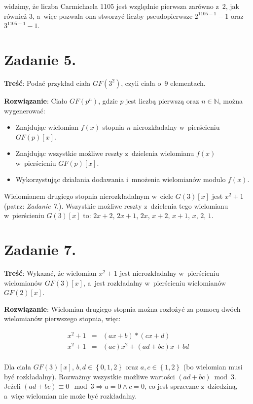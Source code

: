 \documentclass[a4paper,10pt, twocolumn]{article}
\begin{document}
\noindent widzimy, że liczba Carmichaela 1105 jest względnie pierwsza zarówno z~2, jak również 3, a~więc pozwala ona stworzyć liczby pseudopierwsze $2^{1105 - 1} - 1$ oraz $3^{1105 - 1} - 1$.

\section{Zadanie 5.}

\textbf{Treść}: Podać przykład ciała $GF(3^{2})$, czyli ciała o~9 elementach.

\textbf{Rozwiązanie}: Ciało $GF(p^{n})$, gdzie $p$ jest liczbą pierwszą oraz $n \in \mathbb{N}$, można wygenerować:

\begin{itemize}
 \item Znajdując wielomian $f(x)$ stopnia $n$ nierozkładalny w~pierścieniu $GF(p)[x]$.
 \item Znajdując wszystkie możliwe reszty z~dzielenia wielomianu $f(x)$ w~pierścieniu $GF(p)[x]$.
 \item Wykorzystując działania dodawania i~mnożenia wielomianów modulo $f(x)$.
\end{itemize}

Wielomianem drugiego stopnia nierozkładalnym w~ciele $G(3)[x]$ jest $x^2 + 1$ (patrz: \emph{Zadanie 7.}). Wszystkie możliwe reszty z~dzielenia tego wielomianu w~pierścieniu $G(3)[x]$ to: $2x + 2$, $2x + 1$, $2x$, $x + 2$, $x + 1$, $x$, $2$, $1$.

\section{Zadanie 7.}

\textbf{Treść}: Wykazać, że wielomian $x^{2} + 1$ jest nierozkładalny w~pierścieniu wielomianów $GF(3)[x]$, a~jest rozkładalny w~pierścieniu wielomianów $GF(2)[x]$.

\textbf{Rozwiązanie}: Wielomian drugiego stopnia można rozłożyć za pomocą dwóch wielomianów pierwszego stopnia, więc:

\begin{equation*}
	\begin{array}{lcl} x^{2} + 1 & = & (ax + b) * (cx + d) \\ x^{2} + 1 & = & (ac)x^{2} + (ad + bc)x + bd \\ \end{array}
\end{equation*}

Dla ciała $GF(3)[x]$, $b, d \in \left\{0, 1, 2\right\}$ oraz $a, c \in \left\{1, 2\right\}$ (bo wielomian musi być rozkładalny). Rozważmy wszystkie możliwe wartości $(ad + bc) \bmod{3}$. Jeżeli $(ad + bc) \equiv 0 \mod 3 \Rightarrow a = 0 \wedge c = 0$, co jest sprzeczne z~dziedziną, a~więc wielomian nie może być rozkładalny.
\end{document}
